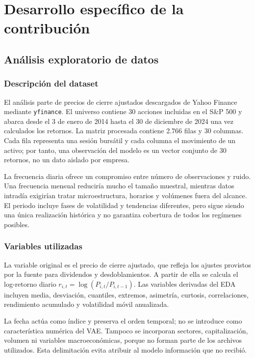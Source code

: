 \chapter{Desarrollo específico de la contribución}

\section{Análisis exploratorio de datos}

\subsection{Descripción del dataset}
El análisis parte de precios de cierre ajustados descargados de Yahoo Finance mediante \texttt{yfinance}. El universo contiene 30 acciones incluidas en el S\&P 500 y abarca desde el 3 de enero de 2014 hasta el 30 de diciembre de 2024 una vez calculados los retornos. La matriz procesada contiene 2.766 filas y 30 columnas. Cada fila representa una sesión bursátil y cada columna el movimiento de un activo; por tanto, una observación del modelo es un vector conjunto de 30 retornos, no un dato aislado por empresa.

La frecuencia diaria ofrece un compromiso entre número de observaciones y ruido. Una frecuencia mensual reduciría mucho el tamaño muestral, mientras datos intradía exigirían tratar microestructura, horarios y volúmenes fuera del alcance. El periodo incluye fases de volatilidad y tendencias diferentes, pero sigue siendo una única realización histórica y no garantiza cobertura de todos los regímenes posibles.

\subsection{Variables utilizadas}
La variable original es el precio de cierre ajustado, que refleja los ajustes provistos por la fuente para dividendos y desdoblamientos. A partir de ella se calcula el log-retorno diario $r_{i,t}=\log(P_{i,t}/P_{i,t-1})$. Las variables derivadas del EDA incluyen media, desviación, cuantiles, extremos, asimetría, curtosis, correlaciones, rendimiento acumulado y volatilidad móvil anualizada.

La fecha actúa como índice y preserva el orden temporal; no se introduce como característica numérica del VAE. Tampoco se incorporan sectores, capitalización, volumen ni variables macroeconómicas, porque no forman parte de los archivos utilizados. Esta delimitación evita atribuir al modelo información que no recibió.

